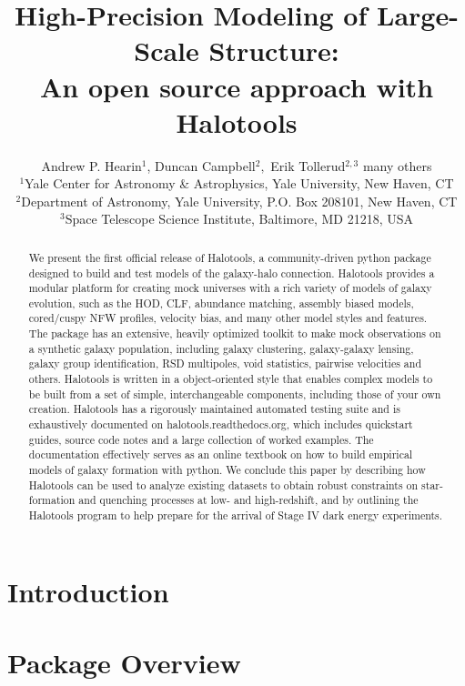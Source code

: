 \documentclass[usenatbib,usegraphicx,letterpaper]{mn2e}
\title[Halotools]
{
High-Precision Modeling of Large-Scale Structure: \\An open source approach with Halotools}
\author[Hearin et al.]
{Andrew P. Hearin$^{1}$, Duncan Campbell$^{2},$ Erik Tollerud$^{2,3}$\newauthor
many others \\
$^1$Yale Center for Astronomy \& Astrophysics, Yale University, New Haven, CT\\
$^2$Department of Astronomy, Yale University, P.O. Box 208101, New Haven, CT\\
$^3$Space Telescope Science Institute, Baltimore, MD 21218, USA}
\begin{document}
\maketitle

\begin{abstract}

We  present the first official release of Halotools, a community-driven python package designed to build and test models of the galaxy-halo connection. Halotools provides a modular platform for creating mock universes with a rich variety of models of galaxy evolution, such as the HOD, CLF, abundance matching, assembly biased models, cored/cuspy NFW profiles, velocity bias, and many other model styles and features. The package has an extensive, heavily optimized toolkit to make mock observations on a synthetic galaxy population, including galaxy clustering, galaxy-galaxy lensing, galaxy group identification, RSD multipoles, void statistics, pairwise velocities and others. Halotools is written in a object-oriented style that enables complex models to be built from a set of simple, interchangeable components, including those of your own creation. Halotools has a rigorously maintained automated testing suite and is exhaustively documented on halotools.readthedocs.org, which includes quickstart guides, source code notes and a large collection of worked examples. The documentation effectively serves as an online textbook on how to build empirical models of galaxy formation with python. We conclude this paper by describing how Halotools can be used to analyze existing datasets to obtain robust constraints on star-formation and quenching processes at low- and high-redshift, and by outlining the Halotools program to help prepare for the arrival of Stage IV dark energy experiments.

\end{abstract} 

\section{Introduction}
\label{section:introduction}

\citet{astropy}

\section{Package Overview}
\label{section:overview}
\end{document}
